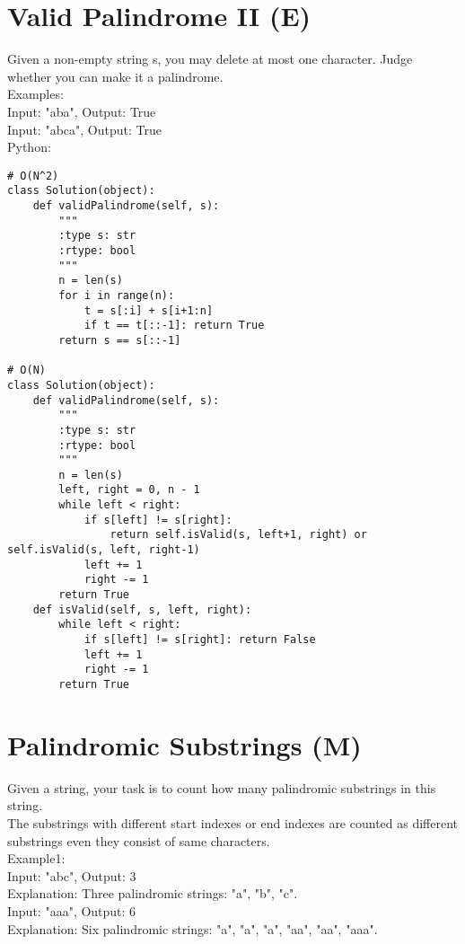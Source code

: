 \section{Valid Palindrome II (E)}
Given a non-empty string s, you may delete at most one character. Judge whether you can make it a palindrome. \\

Examples:\\
Input: "aba", Output: True\\
Input: "abca", Output: True\\

Python:
\lstset{language=python}
\begin{lstlisting}
# O(N^2)
class Solution(object):
    def validPalindrome(self, s):
        """
        :type s: str
        :rtype: bool
        """
        n = len(s)
        for i in range(n):
            t = s[:i] + s[i+1:n]
            if t == t[::-1]: return True
        return s == s[::-1]

# O(N)
class Solution(object):
    def validPalindrome(self, s):
        """
        :type s: str
        :rtype: bool
        """
        n = len(s)
        left, right = 0, n - 1
        while left < right:
            if s[left] != s[right]:
                return self.isValid(s, left+1, right) or self.isValid(s, left, right-1)
            left += 1
            right -= 1
        return True
    def isValid(self, s, left, right):
        while left < right:
            if s[left] != s[right]: return False
            left += 1
            right -= 1
        return True
\end{lstlisting}


\section{Palindromic Substrings (M)}
Given a string, your task is to count how many palindromic substrings in this string.\\

The substrings with different start indexes or end indexes are counted as different substrings even they consist of same characters.\\

Example1:\\
Input: "abc", Output: 3 \\
Explanation: Three palindromic strings: "a", "b", "c".\\

Input: "aaa", Output: 6\\
Explanation: Six palindromic strings: "a", "a", "a", "aa", "aa", "aaa".\\

